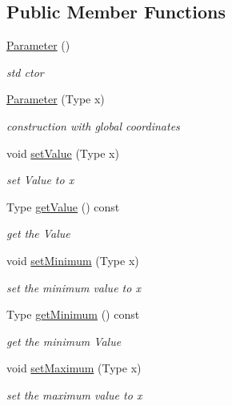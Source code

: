 \subsection*{Public Member Functions}
\begin{DoxyCompactItemize}
\item 
\hyperlink{classParameter_a6000e8cd47acceb8748300e8c82657a3}{Parameter} ()\hypertarget{classParameter_a6000e8cd47acceb8748300e8c82657a3}{}\label{classParameter_a6000e8cd47acceb8748300e8c82657a3}

\begin{DoxyCompactList}\small\item\em std ctor \end{DoxyCompactList}\item 
\hyperlink{classParameter_a55f791445b9a159d7b5f1ce0b4f786b9}{Parameter} (Type x)
\begin{DoxyCompactList}\small\item\em construction with global coordinates \end{DoxyCompactList}\item 
void \hyperlink{classParameter_a9013b47b1190dbb977df02dcf5101d6d}{set\+Value} (Type x)
\begin{DoxyCompactList}\small\item\em set Value to x \end{DoxyCompactList}\item 
Type \hyperlink{classParameter_ac20cb89fbbc4cb6dfdc9779a473659b8}{get\+Value} () const 
\begin{DoxyCompactList}\small\item\em get the Value \end{DoxyCompactList}\item 
void \hyperlink{classParameter_af4017adaebcb220cfcb046bfc9f2005b}{set\+Minimum} (Type x)
\begin{DoxyCompactList}\small\item\em set the minimum value to x \end{DoxyCompactList}\item 
Type \hyperlink{classParameter_a47b69ec50b78a9202ba470ec79282f2b}{get\+Minimum} () const 
\begin{DoxyCompactList}\small\item\em get the minimum Value \end{DoxyCompactList}\item 
void \hyperlink{classParameter_a9148818a721c6b20e25aaa981c932974}{set\+Maximum} (Type x)
\begin{DoxyCompactList}\small\item\em set the maximum value to x \end{DoxyCompactList}\item 

\end{DoxyCompactItemize}

